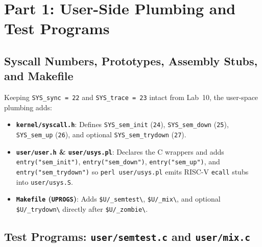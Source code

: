 \documentclass[12pt,a4paper]{article}
\begin{document}
\section{Part 1: User-Side Plumbing and Test Programs}

\subsection{Syscall Numbers, Prototypes, Assembly Stubs, and Makefile}
Keeping \texttt{SYS\_\allowbreak sync = 22} and \texttt{SYS\_\allowbreak trace = 23} intact from Lab~10, the user-space plumbing adds:
\begin{itemize}
    \item \textbf{\texttt{kernel/\allowbreak syscall.h}}: Defines \texttt{SYS\_\allowbreak sem\_\allowbreak init} (\texttt{24}), \texttt{SYS\_\allowbreak sem\_\allowbreak down} (\texttt{25}), \texttt{SYS\_\allowbreak sem\_\allowbreak up} (\texttt{26}), and optional \texttt{SYS\_\allowbreak sem\_\allowbreak trydown} (\texttt{27}).
    \item \textbf{\texttt{user/\allowbreak user.h} \& \texttt{user/\allowbreak usys.pl}}: Declares the C wrappers and adds \texttt{entry("sem\_\allowbreak init")}, \texttt{entry("sem\_\allowbreak down")}, \texttt{entry("sem\_\allowbreak up")}, and \texttt{entry("sem\_\allowbreak trydown")} so \texttt{perl user/\allowbreak usys.pl} emits RISC-V \texttt{ecall} stubs into \texttt{user/\allowbreak usys.S}.
    \item \textbf{\texttt{Makefile} (\texttt{UPROGS})}: Adds \texttt{\$U/\_semtest\textbackslash}, \texttt{\$U/\_mix\textbackslash}, and optional \texttt{\$U/\_trydown\textbackslash} directly after \texttt{\$U/\_zombie\textbackslash}.
\end{itemize}

\subsection{Test Programs: \texttt{user/semtest.c} and \texttt{user/mix.c}}


\newpage

\end{document}
